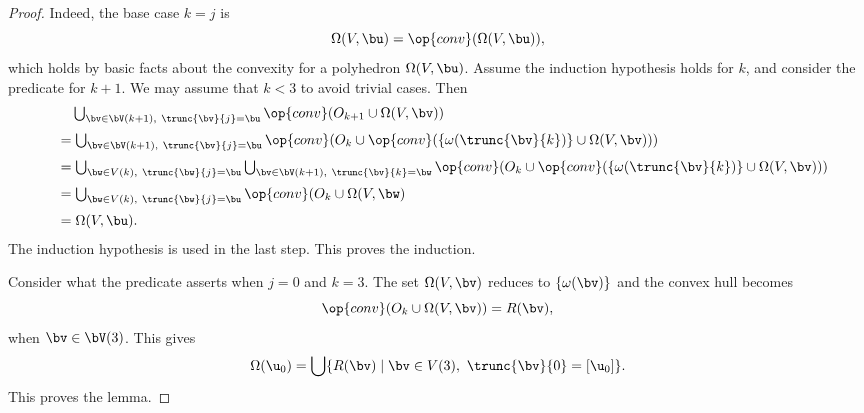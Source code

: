 \begin{proof}
  Indeed, the base case
$k=j$ is 
\begin{displaymath}
\Omega(V,\bu) = \op{conv}(\Omega(V,\bu)),
\end{displaymath}
which holds by basic facts about the convexity for a polyhedron $\Omega(V,\bu)$.
Assume the induction hypothesis holds for $k$, and consider the predicate for
$k+1$.  We may assume that $k<3$ to avoid trivial cases.
Then
\begin{displaymath}
\begin{array}{lll}
&\phantom{=}\bigcup _{\bv \in \bV(k+1),~\trunc{\bv}{j}=\bu}
\op{conv}(O_{k+1} \cup\Omega(V,\bv))
%
\vspace{6pt}\\
&=\bigcup _{\bv \in \bV(k+1),~\trunc{\bv}{j}=\bu}
\op{conv}(O_{k} \cup\op{conv}(\{\omega(\trunc{\bv}{k})\}\cup\Omega(V,\bv)))
\vspace{6pt}\\
&=\bigcup _{\bw\in V(k),~\trunc{\bw}{j}=\bu}
\bigcup_{\bv \in \bV(k+1),~\trunc{\bv}{k}=\bw}
\op{conv}(O_{k} \cup\op{conv}(\{\omega(\trunc{\bv}{k})\}\cup\Omega(V,\bv)))
\vspace{6pt}\\
&=\bigcup _{\bw\in V(k),~\trunc{\bw}{j}=\bu}
\op{conv}(O_{k} \cup \Omega(V,\bw)    
\vspace{6pt}\\
&=\Omega(V,\bu).
\end{array}
\end{displaymath}
The induction hypothesis is used in the last step.  This proves the induction.

Consider  what the predicate asserts when $j=0$ and $k=3$.  The set $\Omega(V,\bv)$
reduces to $\{\omega(\bv)\}$  and the convex hull becomes
\begin{displaymath}
\op{conv}(O_{k}\cup \Omega(V,\bv)) = R(\bv),
\end{displaymath}
when $\bv\in \bV(3)$.
This gives
\begin{displaymath}
\Omega(\u_0) = \bigcup \{ R(\bv) \mid \bv\in V(3),~\trunc{\bv}{0} =[\u_0]\}.
\end{displaymath}
This proves the lemma.
\end{proof}


